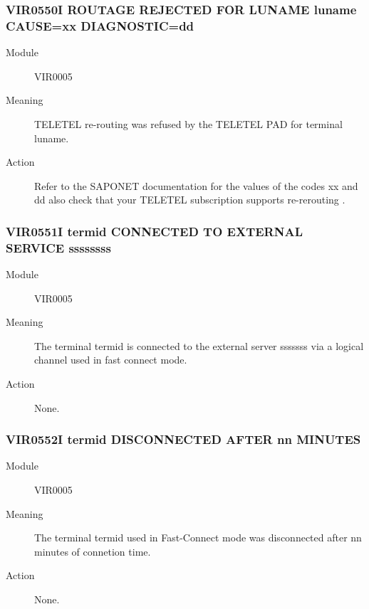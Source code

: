 \documentclass[letterpaper,10pt,english]{sphinxmanual}
\begin{document}
\subsubsection{VIR0550I ROUTAGE REJECTED FOR LUNAME luname CAUSE=xx DIAGNOSTIC=dd}
\label{\detokenize{messages:vir0550i-routage-rejected-for-luname-luname-cause-xx-diagnostic-dd}}\begin{description}
\item[{Module}] \leavevmode
VIR0005

\item[{Meaning}] \leavevmode
TELETEL re-routing was refused by the TELETEL PAD for terminal luname.

\item[{Action}] \leavevmode
Refer to the SAPONET documentation for the values of the codes xx and dd also check that your TELETEL subscription supports re-rerouting .

\end{description}


\subsubsection{VIR0551I termid CONNECTED TO EXTERNAL SERVICE ssssssss}
\label{\detokenize{messages:vir0551i-termid-connected-to-external-service-ssssssss}}\begin{description}
\item[{Module}] \leavevmode
VIR0005

\item[{Meaning}] \leavevmode
The terminal termid is connected to the external server sssssss via a logical channel used in fast connect mode.

\item[{Action}] \leavevmode
None.

\end{description}


\subsubsection{VIR0552I termid DISCONNECTED AFTER nn MINUTES}
\label{\detokenize{messages:vir0552i-termid-disconnected-after-nn-minutes}}\begin{description}
\item[{Module}] \leavevmode
VIR0005

\item[{Meaning}] \leavevmode
The terminal termid used in Fast-Connect mode was disconnected after nn minutes of connetion time.

\item[{Action}] \leavevmode
None.

\end{description}
\end{document}
